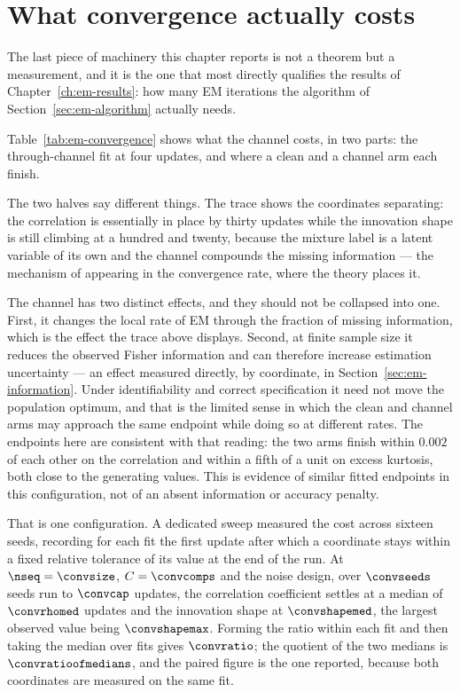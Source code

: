 \section{What convergence actually costs}\label{sec:em-convergence}

The last piece of machinery this chapter reports is not a theorem but a
measurement, and it is the one that most directly qualifies the results of
Chapter~\ref{ch:em-results}: how many EM iterations the algorithm of
Section~\ref{sec:em-algorithm} actually needs.

Table~\ref{tab:em-convergence} shows what the channel costs, in two parts: the
through-channel fit at four updates, and where a clean and a channel arm each
finish.



\noindent The two halves say different things. The trace shows the coordinates
separating: the correlation is essentially in place by thirty updates while the
innovation shape is still climbing at a hundred and twenty, because the mixture
label is a latent variable of its own and the channel compounds the missing
information --- the mechanism of \citet{dempster1977maximum} appearing in the
convergence rate, where the theory places it.

The channel has two distinct effects, and they should not be collapsed into
one. First, it changes the local rate of EM through the fraction of missing
information, which is the effect the trace above displays. Second, at finite
sample size it reduces the observed Fisher information and can therefore
increase estimation uncertainty --- an effect measured directly, by coordinate,
in Section~\ref{sec:em-information}. Under identifiability and correct
specification it need not move the population optimum, and that is the limited
sense in which the clean and channel arms may approach the same endpoint while
doing so at different rates. The endpoints here are consistent with that
reading: the two arms finish within $0.002$ of each other on the correlation
and within a fifth of a unit on excess kurtosis, both close to the generating
values. This is evidence of similar fitted endpoints in this configuration, not
of an absent information or accuracy penalty.

That is one configuration. A dedicated sweep measured the cost across sixteen
seeds, recording for each fit the first update after which a coordinate stays
within a fixed relative tolerance of its value at the end of the run. At
$\nseq = \convsize$, $C = \convcomps$ and the \convdesign{} noise design, over
$\convseeds$ seeds run to $\convcap$ updates, the correlation coefficient
settles at a median of $\convrhomed$ updates and the innovation shape at
$\convshapemed$, the largest observed value being $\convshapemax$. Forming the
ratio within each fit and then taking the median over fits gives $\convratio$;
the quotient of the two medians is $\convratioofmedians$, and the paired figure
is the one reported, because both coordinates are measured on the same fit.

